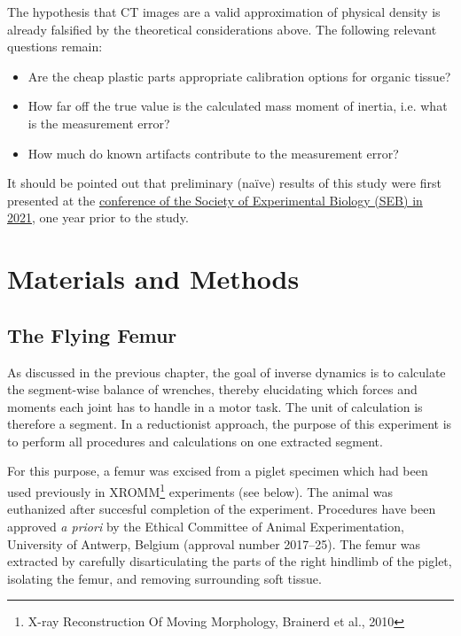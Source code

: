 The hypothesis that CT images are a valid approximation of physical density is already falsified by the theoretical considerations above.
The following relevant questions remain:
\begin{itemize}
\item Are the cheap plastic parts appropriate calibration options for organic tissue?
\item How far off the true value is the calculated mass moment of inertia, i.e. what is the measurement error?
\item How much do known artifacts contribute to the measurement error?
\end{itemize}


It should be pointed out that preliminary (naïve) results of this study were first presented at the \href{http://mielke-bio.info/falk/posts/26.seb2021}{conference of the Society of Experimental Biology (SEB) in 2021}, one year prior to the \citet{Durston2022} study.




\section{Materials and Methods}
\label{sec:orgd5fa8da}
\subsection{The Flying Femur}
\label{sec:org44a57a3}

As discussed in the previous chapter, the goal of inverse dynamics is to calculate the segment-wise balance of wrenches, thereby elucidating which forces and moments each joint has to handle in a motor task.
The unit of calculation is therefore a segment.
In a reductionist approach, the purpose of this experiment is to perform all procedures and calculations on one extracted segment.

For this purpose, a femur was excised from a piglet specimen which had been used previously in XROMM\footnote{X-ray Reconstruction Of Moving Morphology, Brainerd et al., 2010} experiments (see below). \nocite{Brainerd2010}
The animal was euthanized after succesful completion of the experiment.
Procedures have been approved \emph{a priori} by the Ethical Committee of Animal Experimentation, University of Antwerp, Belgium (approval number 2017–25).
The femur was extracted by carefully disarticulating the parts of the right hindlimb of the piglet, isolating the femur, and removing surrounding soft tissue.


